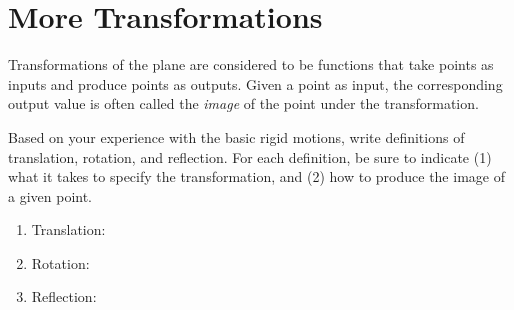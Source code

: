 \newpage

\section{More Transformations}
Transformations of the plane are considered to be functions that take points as inputs and produce 
points as outputs.  Given a point as input, the corresponding output value is often called 
the \emph{image} of the point under the transformation.
\begin{prob}
Based on your experience with the basic rigid motions, write definitions of translation, rotation, and reflection. For each definition, be sure to indicate (1) what it takes to specify the transformation, and (2) how to produce the image of a given point.  
\begin{enumerate}
\item Translation: 
\vspace{0.3in}
\item Rotation: 
\vspace{0.3in}
\item Reflection: 
\vspace{0.3in}
\end{enumerate}
\end{prob}

